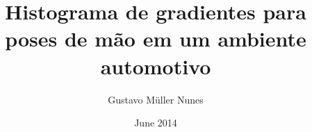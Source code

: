 \documentclass[a4paper,11pt,oneside]{book}
\begin{document}
\author{Gustavo Müller Nunes}
\title{Histograma de gradientes para poses de mão em um ambiente automotivo}
\date{June 2014}

\maketitle
\tableofcontents 	%
\listoftables 		%
\listoffigures 		%

%

%
%
\end{document}
